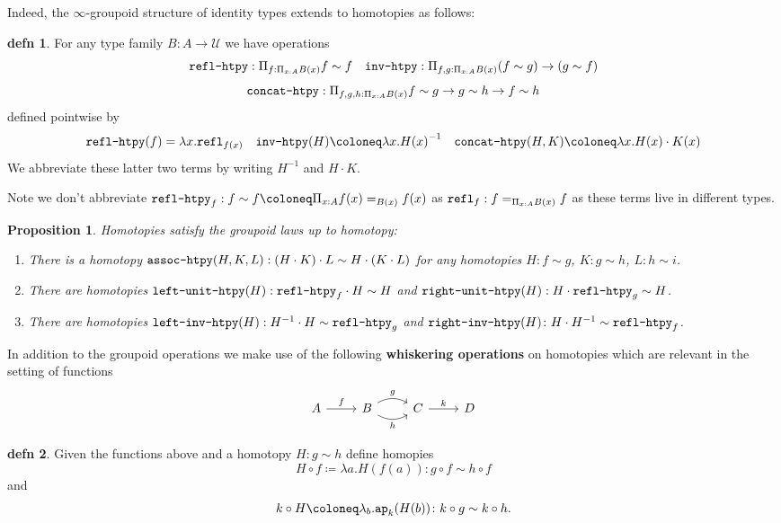 \documentclass{amsart}
\theoremstyle{theorem}
\newtheorem*{prop}{Proposition}
\theoremstyle{definition}
\newtheorem*{defn}{defn}
\theoremstyle{remark}
\newcommand{\0}{\mathbbe{0}}
\newcommand{\1}{\mathbbe{1}}
\newcommand{\2}{\mathbbe{2}}
\newcommand{\3}{\mathbbe{3}}
\newcommand{\4}{\mathbbe{4}}
\newcommand{\term}[1]{{\textup{\texttt{#1}}}}
\newcommand{\refl}{\term{refl}}
\newcommand{\ap}{\term{ap}}
\newcommand{\UU}{{\mathcal{U}}}
\begin{document}
Indeed, the $\infty$-groupoid structure of identity types extends to homotopies as follows:

\begin{defn} For any type family $B \colon A \to \UU$ we have operations
\[ \term{refl-htpy} : \Pi_{f : \Pi_{x:A}B(x)} f \sim f \quad \term{inv-htpy} : \Pi_{f,g :\Pi_{x:A}B(x)} (f \sim g) \to (g \sim f) \]
\[ \term{concat-htpy} : \Pi_{f,g,h : \Pi_{x:A}B(x)} f \sim g \to g \sim h \to f \sim h\]
defined pointwise by
\[ \term{refl-htpy}(f) = \lambda x .\refl_{f(x)} \quad \term{inv-htpy}(H) \coloneq \lambda x. {H(x)}^{-1} \quad \term{concat-htpy}(H,K) \coloneq \lambda x. H(x) \cdot K(x)\]
We abbreviate these latter two terms by writing $H^{-1}$ and $H \cdot K$.
\end{defn}

Note we don't abbreviate $\term{refl-htpy}_f : f \sim f \coloneq \Pi_{x :A} f(x)=_{B(x)} f(x)$ as $\refl_f : f =_{\Pi_{x:A}B(x)}f$ as these terms live in different types.

\begin{prop} Homotopies satisfy the groupoid laws up to homotopy:
\begin{enumerate}
\item There is a homotopy $\term{assoc-htpy}(H,K,L) : (H \cdot K) \cdot L \sim H \cdot (K \cdot L)$ for any homotopies $H : f \sim g$, $K : g \sim h$, $L \colon h \sim i$.
\item There are homotopies $\term{left-unit-htpy}(H) : \term{refl-htpy}_f \cdot H \sim H$ and $\term{right-unit-htpy}(H) : H \cdot \term{refl-htpy}_g \sim H$.
\item There are homotopies $\term{left-inv-htpy}(H) : H^{-1} \cdot H \sim \term{refl-htpy}_g$ and $\term{right-inv-htpy}(H) \colon H \cdot H^{-1} \sim \term{refl-htpy}_f$.
\end{enumerate}
\end{prop}

In addition to the groupoid operations we make use of the following \textbf{whiskering operations} on homotopies which are relevant in the setting of functions
\[
\begin{tikzcd} A \arrow[r, "f"] & B \arrow[r, bend left, "g"] \arrow[r, bend right, "h"'] & C \arrow[r, "k"] & D
\end{tikzcd}
\]

\begin{defn} Given the functions above and a homotopy $H \colon g \sim h$ define homopies
\[ H \circ f \coloneq \lambda a. H(f(a)) \colon g \circ f \sim h \circ f\]
and
\[
k \circ H \coloneq \lambda_b. \ap_k(H(b)) \colon k \circ g \sim k \circ h.\]
\end{defn}
\end{document}
